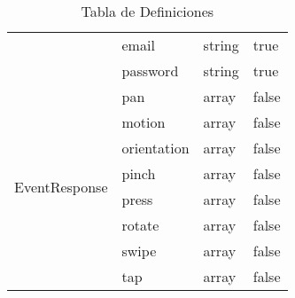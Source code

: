 \begin{itemize}
\begin{table}[h]
\begin{tabular}{ l l l l }
            & email & string & true \\ 
            & password & string & true \\
            \bottomrule
            
            \multirow{8}{*}{EventResponse}
            
            & pan & array & false \\ 
            & motion & array & false \\ 
            & orientation & array & false \\ 
            & pinch & array & false \\ 
            & press & array & false \\ 
            & rotate & array & false \\ 
            & swipe & array & false \\ 
            & tap & array & false \\ 
            \bottomrule
        \end{tabular}
        \caption{Tabla de Definiciones}
        \label{tab:definitions}
 \end{table}
 
\end{itemize}

